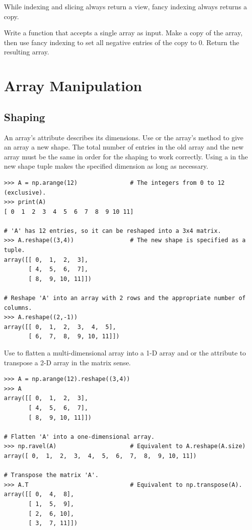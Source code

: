 While indexing and slicing always return a view, fancy indexing always returns a copy.

\begin{problem} %
Write a function that accepts a single array as input.
Make a copy of the array, then use fancy indexing to set all negative entries of the copy to $0$.
Return the resulting array.
\end{problem}

\section*{Array Manipulation} %

\subsection*{Shaping} %

An array's  attribute describes its dimensions.
Use  or the array's  method to give an array a new shape.
The total number of entries in the old array and the new array must be the same in order for the shaping to work correctly.
Using a  in the new shape tuple makes the specified dimension as long as necessary.

\begin{lstlisting}
>>> A = np.arange(12)               # The integers from 0 to 12 (exclusive).
>>> print(A)
[ 0  1  2  3  4  5  6  7  8  9 10 11]

# 'A' has 12 entries, so it can be reshaped into a 3x4 matrix.
>>> A.reshape((3,4))                # The new shape is specified as a tuple.
array([[ 0,  1,  2,  3],
       [ 4,  5,  6,  7],
       [ 8,  9, 10, 11]])

# Reshape 'A' into an array with 2 rows and the appropriate number of columns.
>>> A.reshape((2,-1))
array([[ 0,  1,  2,  3,  4,  5],
       [ 6,  7,  8,  9, 10, 11]])
\end{lstlisting}

Use  to flatten a multi-dimensional array into a 1-D array and  or the  attribute to transpose a 2-D array in the matrix sense.

\begin{lstlisting}
>>> A = np.arange(12).reshape((3,4))
>>> A
array([[ 0,  1,  2,  3],
       [ 4,  5,  6,  7],
       [ 8,  9, 10, 11]])

# Flatten 'A' into a one-dimensional array.
>>> np.ravel(A)                     # Equivalent to A.reshape(A.size)
array([ 0,  1,  2,  3,  4,  5,  6,  7,  8,  9, 10, 11])

# Transpose the matrix 'A'.
>>> A.T                             # Equivalent to np.transpose(A).
array([[ 0,  4,  8],
       [ 1,  5,  9],
       [ 2,  6, 10],
       [ 3,  7, 11]])
\end{lstlisting}

